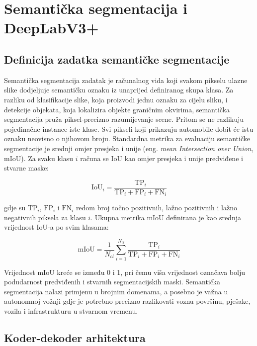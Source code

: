\documentclass[diplomskirad]{fer}
\begin{document}
\section{Semantička segmentacija i DeepLabV3+}
\label{sec:segmentacija}

\subsection{Definicija zadatka semantičke segmentacije}

Semantička segmentacija zadatak je računalnog vida koji svakom pikselu ulazne slike dodjeljuje semantičku oznaku iz unaprijed definiranog skupa klasa. Za razliku od klasifikacije slike, koja proizvodi jednu oznaku za cijelu sliku, i detekcije objekata, koja lokalizira objekte graničnim okvirima, semantička segmentacija pruža piksel-precizno razumijevanje scene. Pritom se ne razlikuju pojedinačne instance iste klase. Svi pikseli koji prikazuju automobile dobit će istu oznaku neovisno o njihovom broju.
Standardna metrika za evaluaciju semantičke segmentacije je srednji omjer presjeka i unije (eng. \textit{mean Intersection over Union}, mIoU). Za svaku klasu $i$ računa se IoU kao omjer presjeka i unije predviđene i stvarne maske:

\begin{equation}
	\text{IoU}_i = \frac{\text{TP}_i}{\text{TP}_i + \text{FP}_i + \text{FN}_i}
\end{equation}

gdje su $\text{TP}_i$, $\text{FP}_i$ i $\text{FN}_i$ redom broj točno pozitivnih, lažno pozitivnih i lažno negativnih piksela za klasu $i$. Ukupna metrika mIoU definirana je kao srednja vrijednost IoU-a po svim klasama:

\begin{equation}
	\text{mIoU} = \frac{1}{N_{cl}} \sum_{i=1}^{N_{cl}} \frac{\text{TP}_i}{\text{TP}_i + \text{FP}_i + \text{FN}_i}
\end{equation}

Vrijednost mIoU kreće se između 0 i 1, pri čemu viša vrijednost označava bolju podudarnost predviđenih i stvarnih segmentacijskih maski. Semantička segmentacija nalazi primjenu u brojnim domenama, a posebno je važna u autonomnoj vožnji gdje je potrebno precizno razlikovati voznu površinu, pješake, vozila i infrastrukturu u stvarnom vremenu.

\subsection{Koder-dekoder arhitektura}
\end{document}
